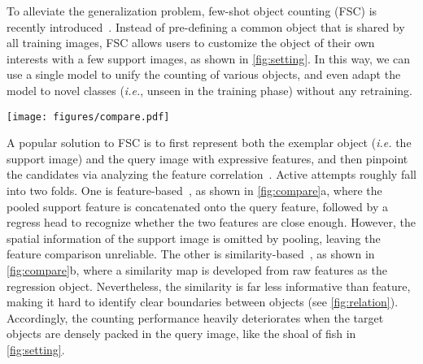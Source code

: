 \documentclass[10pt,twocolumn,letterpaper]{article}
\begin{document}
To alleviate the generalization problem, few-shot object counting (FSC) is recently introduced~\cite{famnet}.
Instead of pre-defining a common object that is shared by all training images, FSC allows users to customize the object of their own interests with a few support images, as shown in \cref{fig:setting}. 
In this way, we can use a single model to unify the counting of various objects, and even adapt the model to novel classes (\textit{i.e.}, unseen in the training phase) without any retraining.


\begin{figure*}[t]
    \centering
    \texttt{[image: figures/compare.pdf]}
    \vspace{-3pt}
    \caption{
        \textbf{Concept comparison} between our method and existing alternatives.
(a) Feature-based approach~\cite{gmn}, where the query feature is concatenated with the pooled support feature for regression.
(b) Similarity-based approach~\cite{cfocnet, famnet}, where a similarity map is developed from raw features for regression.
(c) Our proposed \textit{similarity-aware feature enhancement} block, consisting of a similarity comparison module (SCM) and a feature enhancement module (FEM).
Concretely, the reliable feature similarity developed by SCM is exploited as the guidance of FEM to enhance the query feature with the support feature.
The details of SCM and FEM can be found in \cref{subsec:core-block} and \cref{fig:framework}. 
    }
    \label{fig:compare}
    \vspace{-15pt}
\end{figure*}


A popular solution to FSC is to first represent both the exemplar object (\textit{i.e.} the support image) and the query image with expressive features, and then pinpoint the candidates via analyzing the feature correlation~\cite{gmn, cfocnet, famnet}.
Active attempts roughly fall into two folds.
One is feature-based~\cite{gmn}, as shown in \cref{fig:compare}a, where the pooled support feature is concatenated onto the query feature, followed by a regress head to recognize whether the two features are close enough.
However, the spatial information of the support image is omitted by pooling, leaving the feature comparison unreliable.
The other is similarity-based~\cite{cfocnet, famnet}, as shown in \cref{fig:compare}b, where a similarity map is developed from raw features as the regression object.
Nevertheless, the similarity is far less informative than feature, making it hard to identify clear boundaries between objects (see \cref{fig:relation}).
Accordingly, the counting performance heavily deteriorates when the target objects are densely packed in the query image, like the shoal of fish in \cref{fig:setting}.
\end{document}
